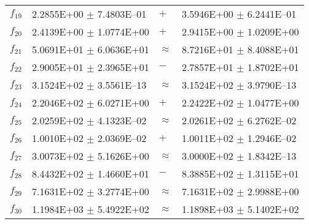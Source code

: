 \begin{table}[ht]
\begin{tabular}{|l|ll|l|}
  $f_{19}$ & 2.2855E+00 $\pm$ 7.4803E--01 & $+$ & 3.5946E+00 $\pm$ 6.2441E--01 \\ 
  $f_{20}$ & 2.4139E+00 $\pm$ 1.0774E+00 & $+$ & 2.9415E+00 $\pm$ 1.0209E+00 \\ 
  $f_{21}$ & 5.0691E+01 $\pm$ 6.0636E+01 & $\approx$ & 8.7216E+01 $\pm$ 8.4088E+01 \\ 
  $f_{22}$ & 2.9005E+01 $\pm$ 2.3965E+01 & $-$ & 2.7857E+01 $\pm$ 1.8702E+01 \\ 
  $f_{23}$ & 3.1524E+02 $\pm$ 3.5561E--13 & $\approx$ & 3.1524E+02 $\pm$ 3.9790E--13 \\ 
  $f_{24}$ & 2.2046E+02 $\pm$ 6.0271E+00 & $+$ & 2.2422E+02 $\pm$ 1.0477E+00 \\ 
  $f_{25}$ & 2.0259E+02 $\pm$ 4.1323E--02 & $\approx$ & 2.0261E+02 $\pm$ 6.2762E--02 \\ 
  $f_{26}$ & 1.0010E+02 $\pm$ 2.0369E--02 & $+$ & 1.0011E+02 $\pm$ 1.2946E--02 \\ 
  $f_{27}$ & 3.0073E+02 $\pm$ 5.1626E+00 & $\approx$ & 3.0000E+02 $\pm$ 1.8342E--13 \\ 
  $f_{28}$ & 8.4432E+02 $\pm$ 1.4660E+01 & $-$ & 8.3885E+02 $\pm$ 1.3115E+01 \\ 
  $f_{29}$ & 7.1631E+02 $\pm$ 3.2774E+00 & $\approx$ & 7.1631E+02 $\pm$ 2.9988E+00 \\ 
  $f_{30}$ & 1.1984E+03 $\pm$ 5.4922E+02 & $\approx$ & 1.1898E+03 $\pm$ 5.1402E+02 \\ 
   \hline
\end{tabular}
\end{table}
